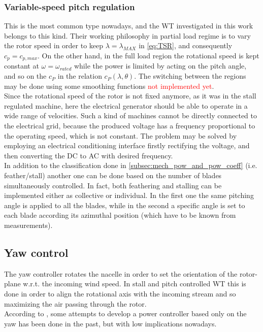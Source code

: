 \subsubsection{Variable-speed pitch regulation}
This is the most common type nowadays, and the \acrshort{WT} investigated in this work belongs to this kind. Their working philosophy in partial load regime is to vary the rotor speed in order to keep $\lambda = \lambda_{MAX}$ in \autoref{eq:TSR}, and consequently $c_p=c_{p,max}$. On the other hand, in the full load region the rotational speed is kept constant at $\omega = \omega_{rated}$ while the power is limited by acting on the pitch angle, and so on the $c_P$ in the relation $c_P(\lambda, \theta)$. The switching between the regions may be done using some smoothing functions \textcolor{red}{not implemented yet}. \\
Since the rotational speed of the rotor is not fixed anymore, as it was in the stall regulated machine, here the electrical generator should be able to operate in a wide range of velocities. Such a kind of machines cannot be directly connected to the electrical grid, because the produced voltage has a frequency proportional to the operating speed, which is not constant. The problem may be solved by employing an electrical conditioning interface firstly rectifying the voltage, and then converting the DC to AC with desired frequency. \\
In addition to the classification done in \ref{subsec:mech_pow_and_pow_coeff} (i.e. feather/stall) another one can be done based on the number of blades simultaneously controlled. In fact, both feathering and stalling can be implemented either as collective or individual. In the first one the same pitching angle is applied to all the blades, while in the second a specific angle is set to each blade according its azimuthal position (which have to be known from measurements).

\subsection{Yaw control}
The yaw controller rotates the nacelle in order to set the orientation of the rotor-plane w.r.t. the incoming wind speed. In stall and pitch controlled \acrshort{WT} this is done in order to align the rotational axis with the incoming stream and so maximizing the air passing through the rotor. \\
According to \cite{Aerodynamics_of_wind_turbines}, some attempts to develop a power controller based only on the yaw has been done in the past, but with low implications nowadays. 

